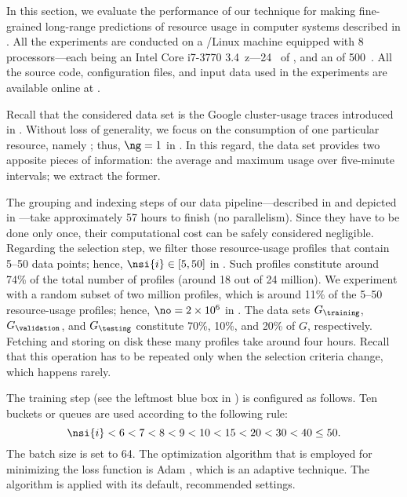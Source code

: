 In this section, we evaluate the performance of our technique for making
fine-grained long-range predictions of resource usage in computer systems
described in . All the experiments are conducted on a
/Linux machine equipped with 8 processors---each being an Intel Core
i7-3770 3.4~z---24~ of , and an  of 500~.
All the source code, configuration files, and input data used in the experiments
are available online at \cite{eslab2017b}.


Recall that the considered data set is the Google cluster-usage traces
\cite{reiss2011} introduced in . Without loss of
generality, we focus on the consumption of one particular resource, namely
; thus, $\ng = 1$ in . In this regard, the data set
provides two apposite pieces of information: the average and maximum 
usage over five-minute intervals; we extract the former.

The grouping and indexing steps of our data pipeline---described in
 and depicted in ---take
approximately 57 hours to finish (no parallelism). Since they have to be done
only once, their computational cost can be safely considered negligible.
Regarding the selection step, we filter those resource-usage profiles that
contain 5--50 data points; hence, $\nsi{i} \in [5, 50]$ in .
Such profiles constitute around 74\% of the total number of profiles (around 18
out of 24 million). We experiment with a random subset of two million profiles,
which is around 11\% of the 5--50 resource-usage profiles; hence, $\no = 2
\times 10^6$ in . The data sets $G_\training$,
$G_\validation$, and $G_\testing$ constitute 70\%, 10\%, and 20\% of $G$,
respectively. Fetching and storing on disk these many profiles take around four
hours. Recall that this operation has to be repeated only when the selection
criteria change, which happens rarely.


The training step (see the leftmost blue box in ) is
configured as follows. Ten buckets or queues are used according to the following
rule:
\[
  \nsi{i} < 6 < 7 < 8 < 9 < 10 < 15 < 20 < 30 < 40 \leq 50.
\]
The batch size \nb is set to 64. The optimization algorithm that is employed for
minimizing the loss function is Adam \cite{kingma2014}, which is an adaptive
technique. The algorithm is applied with its default, recommended settings.

